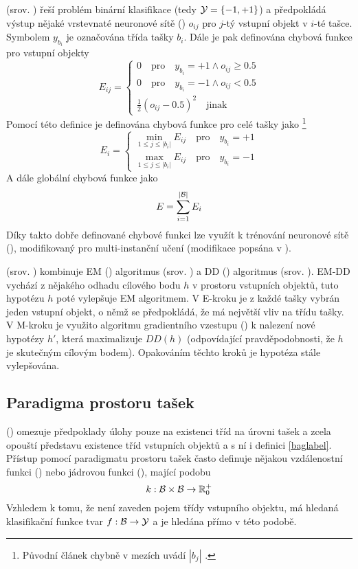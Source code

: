  (srov. \cite{zhou_neural_2002}) řeší problém binární klasifikace (tedy \( \mathcal Y = \left\{ -1, +1 \right\} \)) a předpokládá výstup nějaké vrstevnaté neuronové sítě () \( o_{ij} \) pro \(j\)-tý vstupní objekt v \(i\)-té tašce. Symbolem \( y_{b_i} \) je označována třída tašky \( b_i \). Dále je pak definována chybová funkce pro vstupní objekty
\[ E_{ij} = \begin{cases}
	0 \quad \text{pro} \quad y_{b_i} = +1 \land o_{ij} \geq 0.5 \\
	0 \quad \text{pro} \quad y_{b_i} = -1 \land o_{ij} < 0.5 \\
	\frac{1}{2} \left( o_{ij} - 0.5 \right)^2 \quad \text{jinak}
\end{cases} \]
Pomocí této definice je definována chybová funkce pro celé tašky jako \footnote{Původní článek chybně v mezích uvádí \( \left| b_j \right| \) .}
\[ E_i = \begin{cases}
	\min_{1 \leq j \leq \left| b_i \right|} E_{ij} \quad \text{pro} \quad y_{b_i} = +1 \\
	\max_{1 \leq j \leq \left| b_i \right|} E_{ij} \quad \text{pro} \quad y_{b_i} = -1
\end{cases} \]
A dále globální chybová funkce jako
\[ E = \sum_{i = 1}^{\left| \mathcal B \right|} E_i \]
Díky takto dobře definované chybové funkci lze využít k trénování neuronové sítě  (), modifikovaný pro multi-instanční učení (modifikace popsána v \cite{zhou_neural_2002}).

 (srov. \cite{zhang_em-dd:_2002}) kombinuje EM () algoritmus (srov. \cite{dempster_maximum_1977}) a DD () algoritmus (srov. \cite{maron_framework_1998}). EM-DD vychází z nějakého odhadu cílového bodu \( h \) v prostoru vstupních objektů, tuto hypotézu \( h \) poté vylepšuje EM algoritmem. V E-kroku je z každé tašky vybrán jeden vstupní objekt, o němž se předpokládá, že má největší vliv na třídu tašky. V M-kroku je využito algoritmu gradientního vzestupu () k nalezení nové hypotézy \( h' \), která maximalizuje \( DD \left( h \right) \) (odpovídající pravděpodobnosti, že \( h \) je skutečným cílovým bodem). Opakováním těchto kroků je hypotéza stále vylepšována.

\subsection{Paradigma prostoru tašek}
 () omezuje předpoklady úlohy  pouze na existenci tříd na úrovni tašek a zcela opouští představu existence tříd vstupních objektů a s ní i definici \ref{baglabel}. Přístup pomocí paradigmatu prostoru tašek často definuje nějakou vzdálenostní funkci () nebo jádrovou funkci (), mající podobu
\[ k : \mathcal B \times \mathcal B \to \mathbb R_0^+ \]
Vzhledem k tomu, že není zaveden pojem třídy vstupního objektu, má hledaná klasifikační funkce tvar \( f : \mathcal B \to \mathcal Y \) a je hledána přímo v této podobě.

